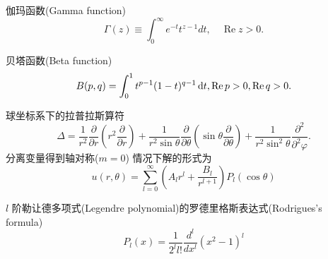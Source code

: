 \documentclass{njustexam}
\begin{document}
伽玛函数(Gamma function)
\[
  \Gamma(z) \equiv \int_{0}^{\infty} e^{-t} t^{z-1} d t,  \quad \operatorname{Re} z>0 . 
\]
\smallskip

贝塔函数(Beta function)
\[
    B(p,  q) = \int_0^1 t^{p -1} (1-t)^{q-1} \mathop{}\!\mathrm{d} t,  \operatorname{Re} p> 0,  \operatorname{Re} q >0. 
    \label{eq:beta_def1}
\]
\smallskip



球坐标系下的拉普拉斯算符
\[
 \Delta = \frac{1}{r^2} \frac{\partial}{\partial r} \left( r^2 \frac{\partial }{\partial r} \right)
  + \frac{1}{r^2\sin \theta} \frac{\partial}{\partial \theta} \left( \sin\theta \frac{\partial}{\partial \theta} \right)
  + \frac{1}{r^2\sin^2 \theta} \frac{\partial^2}{\partial^2 \varphi} .
\]
分离变量得到轴对称($m=0$)
情况下解的形式为
\[
  u(r,  \theta) = \sum_{l=0}^{\infty} \left( A_l r^l + \frac{B_l}{r^{l+1}} \right) P_{l} (\cos \theta)
\]

\smallskip

$l$ 阶勒让德多项式(Legendre polynomial)的罗德里格斯表达式(Rodrigues's formula) 
$$P_l(x)=\frac{1}{2^l l !} \frac{d^l}{d x^l}\left(x^2-1\right)^l$$
\end{document}
